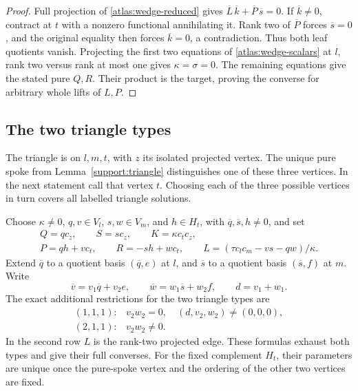 \begin{proof}
Full projection of \eqref{atlas:wedge-reduced} gives
\(\overline L\,\overline k+\overline P\,\overline s=0\).
If \(\overline k\ne0\), contract at \(t\) with a nonzero functional
annihilating it.  Rank two of \(\overline P\) forces \(\overline s=0\),
and the original equality then forces \(\overline k=0\), a contradiction.
Thus both leaf quotients vanish.  Projecting the first two equations of
\eqref{atlas:wedge-scalars} at \(l\), rank two versus rank at most one
gives \(\kappa=\sigma=0\).  The remaining equations give the stated pure
\(Q,R\).  Their product is the target, proving the converse for arbitrary
whole lifts of \(L,P\).
\end{proof}

\subsection{The two triangle types}

The triangle is on \(l,m,t\), with \(z\) its isolated projected vertex.
The unique pure spoke from Lemma~\ref{support:triangle} distinguishes one
of these three vertices.  In the next statement call that vertex \(t\).
Choosing each of the three possible vertices in turn covers all labelled
triangle solutions.

\begin{proposition}\label{atlas:triangle}
Choose \(\kappa\ne0\), \(q,v\in V_l\), \(s,w\in V_m\), and
\(h\in H_t\), with \(\overline q,\overline s,h\ne0\), and set
\begin{equation}\label{atlas:triangle-form}
 \begin{gathered}
 Q=q c_z,\qquad S=s c_z,\qquad K=\kappa c_tc_z,\\
 P=qh+vc_t,\qquad R=-sh+wc_t,\qquad
 L=(\tau c_lc_m-vs-qw)/\kappa.
 \end{gathered}
\end{equation}
Extend \(\overline q\) to a quotient basis \((\overline q,e)\) at \(l\),
and \(\overline s\) to a quotient basis \((\overline s,f)\) at \(m\).
Write
\[
 \overline v=v_1\overline q+v_2e,\qquad
 \overline w=w_1\overline s+w_2f,\qquad d=v_1+w_1.
\]
The exact additional restrictions for the two triangle types are
\begin{equation}\label{atlas:triangle-test}
 \begin{array}{ll}
 (1,1,1):&v_2w_2=0,\quad(d,v_2,w_2)\ne(0,0,0),\\
 (2,1,1):&v_2w_2\ne0.
 \end{array}
\end{equation}
In the second row \(L\) is the rank-two projected edge.
These formulas exhaust both types and give their full converses.
For the fixed complement \(H_t\), their parameters are unique once the
pure-spoke vertex and the ordering of the other two vertices are fixed.
\end{proposition}

